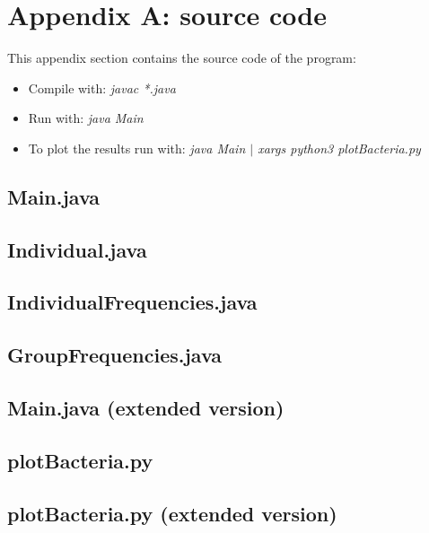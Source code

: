 \documentclass[runningheads]{llncs}
\begin{document}
\section{Appendix A: source code}\label{appendix}
This appendix section contains the source code of the program:
\begin{itemize}
\item Compile with: \textit{javac *.java}
\item Run with: \textit{java Main}
\item To plot the results run with: \textit{java Main $|$ xargs python3 plotBacteria.py}
\end{itemize}

\subsection{Main.java}\label{main}


\subsection{Individual.java}\label{ind}


\subsection{IndividualFrequencies.java}\label{indfre}


\subsection{GroupFrequencies.java}\label{groupfre}


\subsection{Main.java (extended version)}\label{mainext}


\subsection{plotBacteria.py}\label{plot1}


\subsection{plotBacteria.py (extended version)}\label{plot1}


%
\end{document}
